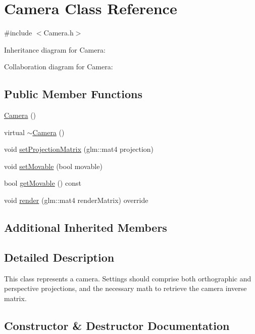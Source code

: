 \hypertarget{classCamera}{}\section{Camera Class Reference}
\label{classCamera}


{\ttfamily \#include $<$Camera.\+h$>$}



Inheritance diagram for Camera\+:


Collaboration diagram for Camera\+:
\subsection*{Public Member Functions}
\begin{DoxyCompactItemize}
\item 
\hyperlink{classCamera_a01f94c3543f56ede7af49dc778f19331}{Camera} ()
\item 
virtual \hyperlink{classCamera_ad1897942d0ccf91052386388a497349f}{$\sim$\+Camera} ()
\item 
void \hyperlink{classCamera_a153d920e646e06c882606e38ef23df9a}{set\+Projection\+Matrix} (glm\+::mat4 projection)
\item 
void \hyperlink{classCamera_afea7920e4a36865a5062a05eb6a381ed}{set\+Movable} (bool movable)
\item 
bool \hyperlink{classCamera_a5140fa7588dab50da4d932ab32baf7f3}{get\+Movable} () const
\item 
void \hyperlink{classCamera_adb0f3d1a0119a86ca7d68e54468b8eef}{render} (glm\+::mat4 render\+Matrix) override
\end{DoxyCompactItemize}
\subsection*{Additional Inherited Members}


\subsection{Detailed Description}
This class represents a camera. Settings should comprise both orthographic and perspective projections, and the necessary math to retrieve the camera inverse matrix. 

\subsection{Constructor \& Destructor Documentation}
\mbox{\label{classCamera_a01f94c3543f56ede7af49dc778f19331}} 
